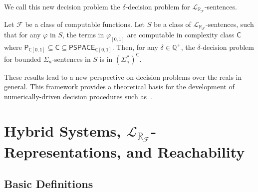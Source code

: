 \documentclass[envcountsect]{llncs}
\newcommand{\lrf}{\mathcal{L}_{\mathbb{R}_{\mathcal{F}}}}
\begin{document}
We call this new decision problem the $\delta$-decision problem for
$\lrf$-sentences.
\begin{theorem}[Complexity]\label{compmain}
Let $\mathcal{F}$ be a class of computable functions. Let $S$ be a class of
$\lrf$-sentences, such that for any $\varphi$ in $S$, the
terms in $\varphi_{[0,1]}$ are computable in complexity class $\mathsf{C}$ where
$\mathsf{P_{C[0,1]}\subseteq \mathsf{C}\subseteq \mathsf{PSPACE_{C[0,1]}}}$.
Then, for any $\delta\in \mathbb{Q}^+$, the $\delta$-decision problem for
bounded $\Sigma_n$-sentences in $S$ is in $\mathsf{(\Sigma_n^P)^C}$.
\end{theorem}

These results lead to a
new perspective on decision problems over the reals in general.
This framework provides a theoretical basis for the development of
numerically-driven decision procedures such as~\cite{}.

\section{Hybrid Systems, $\lrf$-Representations, and
Reachability}\label{language}

\subsection{Basic Definitions}
\end{document}
